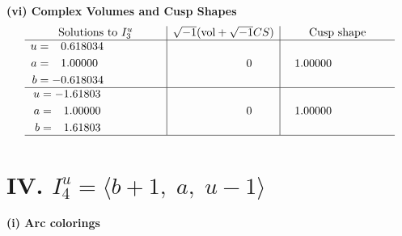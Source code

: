 \documentclass[1p]{elsarticle_modified}
\theoremstyle{definition}
\newcommand{\I}{\sqrt{-1}}
\begin{document}
\newpage\flushleft \textbf{(vi) Complex Volumes and Cusp Shapes}
$$\begin{array}{c|c|c}  
\text{Solutions to }I^u_{3}& \I (\text{vol} + \sqrt{-1}CS) & \text{Cusp shape}\\
 \hline 
\begin{aligned}
u &= \phantom{-}0.618034\phantom{ +0.000000I} \\
a &= \phantom{-}1.00000\phantom{ +0.000000I} \\
b &= -0.618034\phantom{ +0.000000I}\end{aligned}
 & \phantom{-0.000000 } 0 & \phantom{-}1.00000\phantom{ +0.000000I} \\ \hline\begin{aligned}
u &= -1.61803\phantom{ +0.000000I} \\
a &= \phantom{-}1.00000\phantom{ +0.000000I} \\
b &= \phantom{-}1.61803\phantom{ +0.000000I}\end{aligned}
 & \phantom{-0.000000 } 0 & \phantom{-}1.00000\phantom{ +0.000000I}\\
 \hline 
 \end{array}$$\newpage\newpage\renewcommand{\arraystretch}{1}
\centering \section*{IV. $I^u_{4}= \langle b+1,\;a,\;u-1 \rangle$}
\flushleft \textbf{(i) Arc colorings}\\
\end{document}
